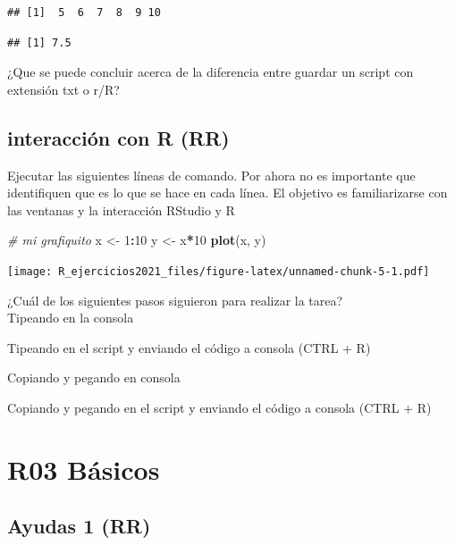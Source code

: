 \documentclass[]{book}
\newenvironment{Shaded}{\begin{snugshade}}{\end{snugshade}}
\newcommand{\CommentTok}[1]{\textcolor[rgb]{0.56,0.35,0.01}{\textit{#1}}}
\newcommand{\DecValTok}[1]{\textcolor[rgb]{0.00,0.00,0.81}{#1}}
\newcommand{\KeywordTok}[1]{\textcolor[rgb]{0.13,0.29,0.53}{\textbf{#1}}}
\newcommand{\NormalTok}[1]{#1}
\newcommand{\OperatorTok}[1]{\textcolor[rgb]{0.81,0.36,0.00}{\textbf{#1}}}
\newcommand{\StringTok}[1]{\textcolor[rgb]{0.31,0.60,0.02}{#1}}
\begin{document}
\begin{verbatim}
## [1]  5  6  7  8  9 10
\end{verbatim}

\begin{verbatim}
## [1] 7.5
\end{verbatim}

¿Que se puede concluir acerca de la diferencia entre guardar un script con extensión txt o r/R?

\hypertarget{interacciuxf3n-con-r-rr}{%
\section{interacción con R (RR)}\label{interacciuxf3n-con-r-rr}}

Ejecutar las siguientes líneas de comando. Por ahora no es importante que identifiquen que es lo que se hace en cada línea. El objetivo es familiarizarse con las ventanas y la interacción RStudio y R

\begin{Shaded}
\begin{Highlighting}[]
\CommentTok{# mi grafiquito}
\NormalTok{x <-}\StringTok{ }\DecValTok{1}\OperatorTok{:}\DecValTok{10}
\NormalTok{y <-}\StringTok{ }\NormalTok{x}\OperatorTok{*}\DecValTok{10}
\KeywordTok{plot}\NormalTok{(x, y)}
\end{Highlighting}
\end{Shaded}

\texttt{[image: R\_ejercicios2021\_files/figure-latex/unnamed-chunk-5-1.pdf]}

¿Cuál de los siguientes pasos siguieron para realizar la tarea?\\

Tipeando en la consola

Tipeando en el script y enviando el código a consola (CTRL + R)

Copiando y pegando en consola

Copiando y pegando en el script y enviando el código a consola (CTRL + R)

\hypertarget{r03-buxe1sicos}{%
\chapter*{R03 Básicos}\label{r03-buxe1sicos}}

\hypertarget{ayudas-1-rr}{%
\section{Ayudas 1 (RR)}\label{ayudas-1-rr}}
\end{document}
